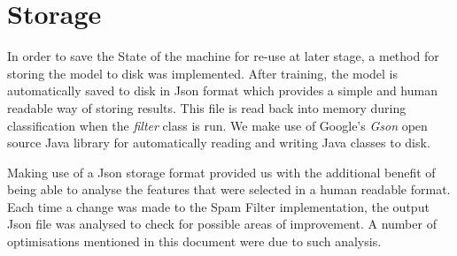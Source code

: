 \section{Storage}

In order to save the State of the machine for re-use at later stage, a method for storing the model to disk was implemented. After training, the model is automatically saved to disk in Json format which provides a simple and human readable way of storing results. This file is read back into memory during classification when the \emph{filter} class is run. We make use of Google's \emph{Gson} open source Java library \cite{google:gson} for automatically reading and writing Java classes to disk. 

Making use of a Json storage format provided us with the additional benefit of being able to analyse the features that were selected in a human readable format. Each time a change was made to the Spam Filter implementation, the output Json file was analysed to check for possible areas of improvement. A number of optimisations mentioned in this document were due to such analysis.